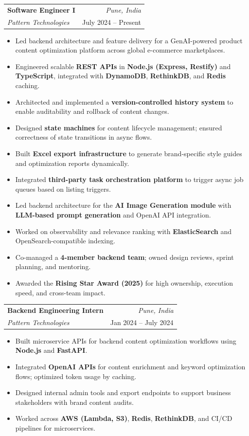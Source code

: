\documentclass[a4paper,11pt]{article}
\makeatletter
\newcommand{\resumeSubheading}[4]{
\vspace{0.5mm}\item
    \begin{tabular*}{0.98\textwidth}[t]{l@{\extracolsep{\fill}}r}
        \textbf{#1} & \textit{\footnotesize{#4}} \\
        \textit{\footnotesize{#3}} &  \footnotesize{#2}\\
    \end{tabular*}
    \vspace{-2.4mm}
}
\newcommand{\resumeItemListStart}{\begin{justify}\begin{itemize}[leftmargin=3ex, rightmargin=2ex, noitemsep,labelsep=1.2mm,itemsep=0mm]\small}
\newcommand{\resumeItemListEnd}{\end{itemize}\end{justify}\vspace{-2mm}}
\makeatother
\begin{document}
\resumeSubheading
{Software Engineer I}{July 2024 -- Present}
{Pattern Technologies}{Pune, India}
\resumeItemListStart
\item {Led backend architecture and feature delivery for a GenAI-powered product content optimization platform across global e-commerce marketplaces.}
\item {Engineered scalable \textbf{REST APIs} in \textbf{Node.js (Express, Restify)} and \textbf{TypeScript}, integrated with \textbf{DynamoDB}, \textbf{RethinkDB}, and \textbf{Redis} caching.}
\item {Architected and implemented a \textbf{version-controlled history system} to enable auditability and rollback of content changes.}
\item {Designed \textbf{state machines} for content lifecycle management; ensured correctness of state transitions in async flows.}
\item {Built \textbf{Excel export infrastructure} to generate brand-specific style guides and optimization reports dynamically.}
\item {Integrated \textbf{third-party task orchestration platform} to trigger async job queues based on listing triggers.}
\item {Led backend architecture for the \textbf{AI Image Generation module} with \textbf{LLM-based prompt generation} and OpenAI API integration.}
\item {Worked on observability and relevance ranking with \textbf{ElasticSearch} and OpenSearch-compatible indexing.}
\item {Co-managed a \textbf{4-member backend team}; owned design reviews, sprint planning, and mentoring.}
\item {Awarded the \textbf{Rising Star Award (2025)} for high ownership, execution speed, and cross-team impact.}
\resumeItemListEnd

\resumeSubheading
{Backend Engineering Intern}{Jan 2024 -- July 2024}
{Pattern Technologies}{Pune, India}
\resumeItemListStart
\item {Built microservice APIs for backend content optimization workflows using \textbf{Node.js} and \textbf{FastAPI}.}
\item {Integrated \textbf{OpenAI APIs} for content enrichment and keyword optimization flows; optimized token usage by caching.}
\item {Designed internal admin tools and export endpoints to support business stakeholders with brand content audits.}
\item {Worked across \textbf{AWS (Lambda, S3)}, \textbf{Redis}, \textbf{RethinkDB}, and CI/CD pipelines for microservices.}
\resumeItemListEnd
\end{document}
